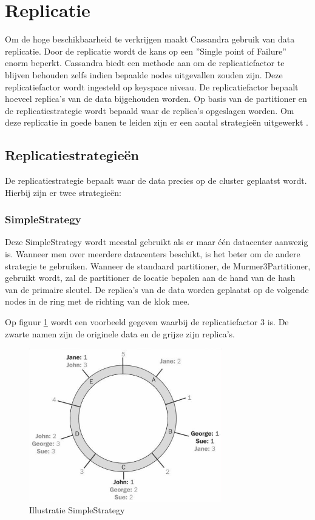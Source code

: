 \section{Replicatie}
\label{sec_replication}
Om de hoge beschikbaarheid te verkrijgen maakt Cassandra gebruik van data replicatie.
Door de replicatie wordt de kans op een ''Single point of Failure'' enorm beperkt.
Cassandra biedt een methode aan om de replicatiefactor te blijven behouden zelfs indien bepaalde nodes uitgevallen zouden zijn.
Deze replicatiefactor wordt ingesteld op keyspace niveau.
De replicatiefactor bepaalt hoeveel replica's van de data bijgehouden worden.
Op basis van de partitioner en de replicatiestrategie wordt  bepaald waar de replica's opgeslagen worden.
Om deze replicatie in goede banen te leiden zijn er een aantal strategieën uitgewerkt \citep{kan2014cassandra}.

\subsection{Replicatiestrategieën}
De replicatiestrategie bepaalt waar de data precies op de cluster geplaatst wordt.
Hierbij zijn er twee strategieën:

\subsubsection{SimpleStrategy}
Deze SimpleStrategy wordt meestal gebruikt als er maar één datacenter aanwezig is.
Wanneer men over meerdere datacenters beschikt, is het beter om de andere strategie te gebruiken.
Wanneer de standaard partitioner, de Murmer3Partitioner, gebruikt wordt, zal de partitioner de locatie bepalen aan de hand van de hash van de primaire sleutel.
De replica's van de data worden geplaatst op de volgende nodes in de ring met de richting van de klok mee.
	
Op figuur \ref{fig:simple_strategy} wordt een voorbeeld gegeven waarbij de replicatiefactor 3 is.
De zwarte namen zijn de originele data en de grijze zijn replica's.
	
\begin{figure}[H]
	\centering
	\includegraphics[width=0.75\textwidth]{img/4_architectuur/SimpleStrategy}
	\caption{Illustratie SimpleStrategy \citep{strickland2014availability}}
	\label{fig:simple_strategy}
\end{figure}
	
